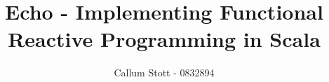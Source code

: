 \documentclass{article}
\begin{document}
  \title{Echo - Implementing Functional Reactive Programming in Scala}
  \author{Callum Stott - 0832894}
  \maketitle
\end{document}
